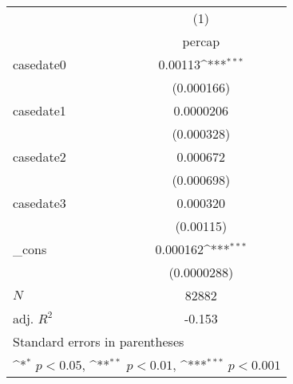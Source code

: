 {
\def\sym#1{\ifmmode^{#1}\else\(^{#1}\)\fi}
\begin{tabular}{l*{1}{c}}
\hline\hline
            &\multicolumn{1}{c}{(1)}\\
            &\multicolumn{1}{c}{percap}\\
\hline
casedate0   &     0.00113\sym{***}\\
            &  (0.000166)         \\
[1em]
casedate1   &   0.0000206         \\
            &  (0.000328)         \\
[1em]
casedate2   &    0.000672         \\
            &  (0.000698)         \\
[1em]
casedate3   &    0.000320         \\
            &   (0.00115)         \\
[1em]
\_cons      &    0.000162\sym{***}\\
            & (0.0000288)         \\
\hline
\(N\)       &       82882         \\
adj. \(R^{2}\)&      -0.153         \\
\hline\hline
\multicolumn{2}{l}{\footnotesize Standard errors in parentheses}\\
\multicolumn{2}{l}{\footnotesize \sym{*} \(p<0.05\), \sym{**} \(p<0.01\), \sym{***} \(p<0.001\)}\\
\end{tabular}
}
